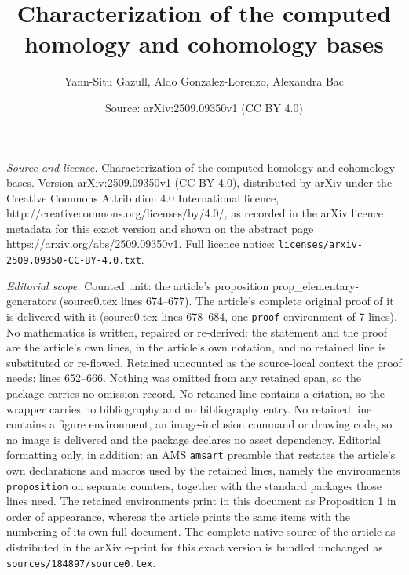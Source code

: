 \documentclass[10pt,a4paper]{amsart}
\title{Characterization of the computed homology and cohomology bases}
\author{Yann-Situ Gazull, Aldo Gonzalez-Lorenzo, Alexandra Bac}
\date{Source: arXiv:2509.09350v1 (CC BY 4.0)}
\begin{document}
\maketitle

\noindent\emph{Source and licence.} Characterization of the computed homology and cohomology bases. Version arXiv:2509.09350v1 (CC BY 4.0), distributed by arXiv under the Creative Commons Attribution 4.0 International licence, http://creativecommons.org/licenses/by/4.0/, as recorded in the arXiv licence metadata for this exact version and shown on the abstract page https://arxiv.org/abs/2509.09350v1. Full licence notice: \texttt{licenses/arxiv-2509.09350-CC-BY-4.0.txt}.\par\smallskip

\noindent\textit{Editorial scope.} Counted unit: the article's proposition prop\_elementary-generators (source0.tex lines 674--677). The article's complete original proof of it is delivered with it (source0.tex lines 678--684, one \texttt{proof} environment of 7 lines). No mathematics is written, repaired or re-derived: the statement and the proof are the article's own lines, in the article's own notation, and no retained line is substituted or re-flowed.  Retained uncounted as the source-local context the proof needs: lines 652--666.  Nothing was omitted from any retained span, so the package carries no omission record.  No retained line contains a citation, so the wrapper carries no bibliography and no bibliography entry.  No retained line contains a figure environment, an image-inclusion command or drawing code, so no image is delivered and the package declares no asset dependency.  Editorial formatting only, in addition: an AMS \texttt{amsart} preamble that restates the article's own declarations and macros used by the retained lines, namely the environments \texttt{proposition} on separate counters, together with the standard packages those lines need.  The retained environments print in this document as Proposition 1 in order of appearance, whereas the article prints the same items with the numbering of its own full document.  The complete native source of the article as distributed in the arXiv e-print for this exact version is bundled unchanged as \texttt{sources/184897/source0.tex}.
\end{document}
